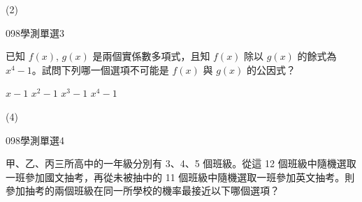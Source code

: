 \begin{QUESTIONS}
\begin{QUESTION}
        \begin{QANS}
            (2)
        \end{QANS}
        \begin{QSOLLIST}
        \end{QSOLLIST}
        \begin{QEMPTYSPACE}
        \end{QEMPTYSPACE}
    \end{QUESTION}
    \begin{QUESTION}
        \begin{ExamInfo}{098}{學測}{單選}{3}
        \end{ExamInfo}
        \begin{ExamAnsRateInfo}{27}{39}{25}{17}
        \end{ExamAnsRateInfo}
        \begin{QBODY}
			已知 $f(x)$, $g(x)$ 是兩個實係數多項式，且知 $f(x)$ 除以 $g(x)$ 的餘式為 $x^4 -1$。試問下列哪一個選項不可能是 $f(x)$ 與 $g(x)$ 的公因式？ 
			\begin{QOPS} 
				\QOP $x-1$ 
				\QOP $x^2-1$ 
				\QOP $x^3-1$ 
				\QOP $x^4-1$
			\end{QOPS}
        \end{QBODY}
        \begin{QFROMS}
        \end{QFROMS}
        \begin{QTAGS}\end{QTAGS}
        \begin{QANS}
            (4)
        \end{QANS}
        \begin{QSOLLIST}
        \end{QSOLLIST}
        \begin{QEMPTYSPACE}
        \end{QEMPTYSPACE}
    \end{QUESTION}
    \begin{QUESTION}
        \begin{ExamInfo}{098}{學測}{單選}{4}
        \end{ExamInfo}
        \begin{ExamAnsRateInfo}{42}{80}{38}{8}
        \end{ExamAnsRateInfo}
        \begin{QBODY}
		甲、乙、丙三所高中的一年級分別有 3、4、5 個班級。從這 12 個班級中隨機選取一班參加國文抽考，再從未被抽中的 11 個班級中隨機選取一班參加英文抽考。則參加抽考的兩個班級在同一所學校的機率最接近以下哪個選項？

\end{QBODY}
\end{QUESTION}
\end{QUESTIONS}
